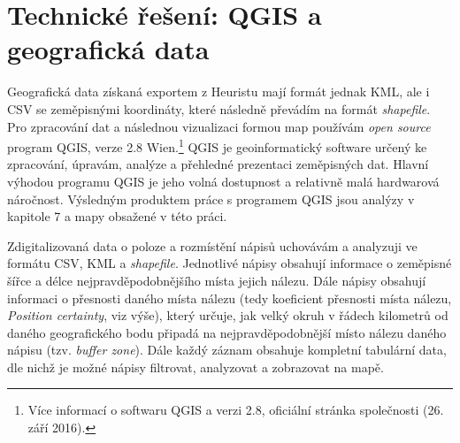 
\section[technické-řešení-qgis-a-geografická-data]{Technické řešení: QGIS a geografická data}

Geografická data získaná exportem z Heuristu mají formát jednak KML, ale i CSV se zeměpisnými koordináty, které následně převádím na formát {\em shapefile}. Pro zpracování dat a následnou vizualizaci formou map používám {\em open source} program QGIS, verze 2.8 Wien.\footnote{Více informací o softwaru QGIS a verzi 2.8, oficiální stránka společnosti \from[url8] (26. září 2016).} QGIS je geoinformatický software určený ke zpracování, úpravám, analýze a přehledné prezentaci zeměpisných dat. Hlavní výhodou programu QGIS je jeho volná dostupnost a relativně malá hardwarová náročnost. Výsledným produktem práce s programem QGIS jsou analýzy v kapitole 7 a mapy obsažené v této práci.

Zdigitalizovaná data o poloze a rozmístění nápisů uchovávám a analyzuji ve formátu CSV, KML a {\em shapefile}. Jednotlivé nápisy obsahují informace o zeměpisné šířce a délce nejpravděpodobnějšího místa jejich nálezu. Dále nápisy obsahují informaci o přesnosti daného místa nálezu (tedy koeficient přesnosti místa nálezu, {\em Position certainty}, viz výše), který určuje, jak velký okruh v řádech kilometrů od daného geografického bodu připadá na nejpravděpodobnější místo nálezu daného nápisu (tzv. {\em buffer zone}). Dále každý záznam obsahuje kompletní tabulární data, dle nichž je možné nápisy filtrovat, analyzovat a zobrazovat na mapě.

